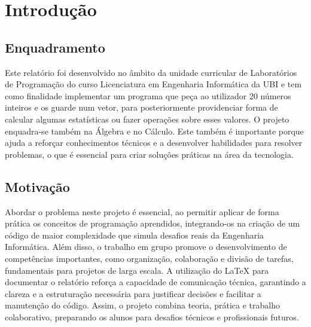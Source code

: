 \chapter{Introdução}
\label{chap:intro}

\section{Enquadramento}
\label{sec:amb} 

Este relatório foi desenvolvido no âmbito da unidade curricular de Laboratórios de Programação do curso Licenciatura em Engenharia Informática da \ac{UBI} e tem como finalidade implementar  um programa que peça ao utilizador 20 números inteiros e os guarde num vetor, para  posteriormente  providenciar forma de calcular algumas estatísticas ou fazer operações sobre esses valores. O projeto enquadra-se também na Álgebra e no Cálculo. Este também é importante porque ajuda a reforçar conhecimentos técnicos e a desenvolver habilidades para resolver problemas, o que é essencial para criar soluções práticas na área da tecnologia. \par


\section{Motivação}
\label{sec:mot}
Abordar o problema neste projeto é essencial, ao permitir aplicar de forma prática os conceitos de programação aprendidos, integrando-os na criação de um código de maior complexidade que simula desafios reais da Engenharia Informática. Além disso, o trabalho em grupo promove o desenvolvimento de competências importantes, como organização, colaboração e divisão de tarefas, fundamentais para projetos de larga escala. A utilização do LaTeX para documentar o relatório reforça a capacidade de comunicação técnica, garantindo a clareza e a estruturação necessária para justificar decisões e facilitar a manutenção do código. Assim, o projeto combina teoria, prática e trabalho colaborativo, preparando os alunos para desafios técnicos e profissionais futuros.


